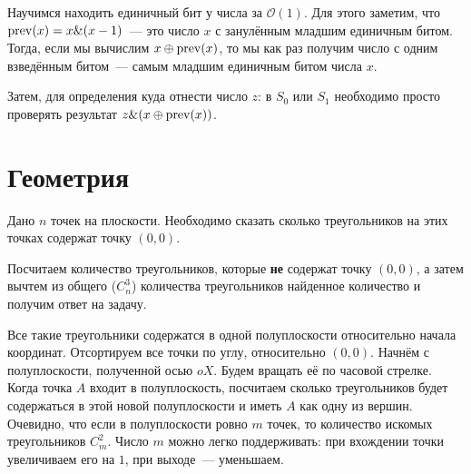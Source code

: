 \documentclass[addpoints]{exam}
\begin{document}
\begin{questions}
\begin{solution}
Научимся находить единичный бит у числа за $\mathcal{O}(1)$. Для этого заметим, что $\operatorname{prev}(x) = x \& (x - 1)$~--- это число $x$ с занулённым младшим единичным битом. Тогда, если мы вычислим $x \oplus \operatorname{prev}(x)$, то мы как раз получим число с одним взведённым битом~--- самым младшим единичным битом числа $x$.

Затем, для определения куда отнести число $z$: в $S_0$ или $S_1$ необходимо просто проверять результат $z \& (x \oplus \operatorname{prev}(x))$.

\end{solution}


\section{Геометрия}

\question Дано $n$ точек на плоскости. Необходимо сказать сколько треугольников на этих точках содержат точку $(0,0)$. 


\begin{solution}

Посчитаем количество треугольников, которые \textbf{не} содержат точку $(0,0)$, а затем вычтем из общего ($C_n^3$) количества треугольников найденное количество и получим ответ на задачу.

Все такие треугольники содержатся в одной полуплоскости относительно начала координат. Отсортируем все точки по углу, относительно $(0,0)$. Начнём с полуплоскости, полученной осью $oX$. Будем вращать её по часовой стрелке. Когда точка $A$ входит в полуплоскость, посчитаем сколько треугольников будет содержаться в этой новой полуплоскости и иметь $A$ как одну из вершин. Очевидно, что если в полуплоскости ровно $m$ точек, то количество искомых треугольников $C_m^2$. Число $m$ можно легко поддерживать: при вхождении точки увеличиваем его на $1$, при выходе~--- уменьшаем.


\end{solution}
\end{questions}
\end{document}
